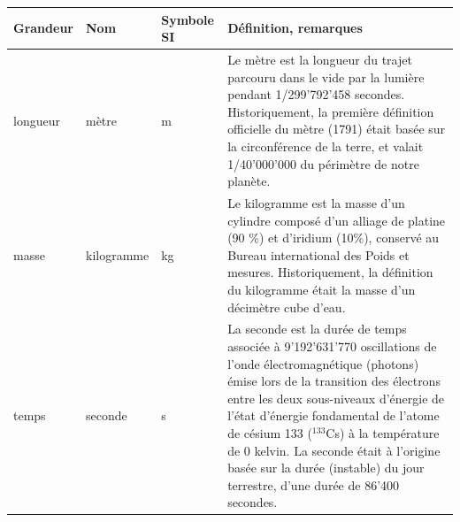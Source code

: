 \begin{center}
    \begin{tabular}[t]{>{\pbs\raggedright}p{2.5cm}
        >{\pbs\centering}p{2.2cm}
        >{\pbs\centering}p{2.3cm}
        >{\pbs\raggedright}p{7cm}}
        \hline\hline
        \textbf{Grandeur} & \textbf{Nom} & \textbf{Symbole SI} & \textbf{Définition, remarques} \\
        \hline
        longueur          & mètre        & m                   &
        Le mètre est la longueur du trajet parcouru dans le vide par la lumière pendant 1/299'792'458 secondes. Historiquement, la première définition officielle du mètre (1791) était basée sur la circonférence de la terre, et valait 1/40'000'000 du périmètre de notre planète.
        \\ \hline
        masse             & kilogramme   & kg                  &
        Le kilogramme est la masse d'un cylindre composé d'un alliage de platine (90 \%) et d'iridium (10\%), conservé au Bureau international des Poids et mesures. Historiquement, la définition du kilogramme était la masse d'un décimètre cube d'eau.
        \\ \hline
        temps             & seconde      & s                   &
        La seconde est la durée de temps associée à 9'192'631'770 oscillations de l'onde électromagnétique (photons) émise lors de la transition des électrons entre les deux sous-niveaux d'énergie de l'état d'énergie fondamental de l'atome de césium 133 ($^{133}$Cs) à la température de 0 kelvin. La seconde était à l'origine basée sur la durée (instable) du jour terrestre, d'une durée de 86'400 secondes.
        \\ \hline
    \end{tabular}
\end{center}
